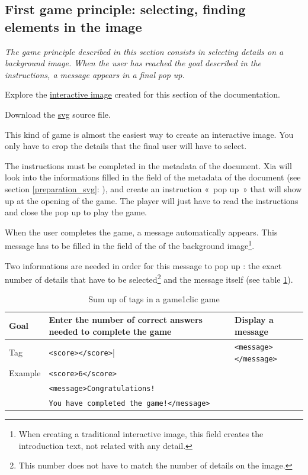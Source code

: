 \subsection{First game principle: selecting, finding elements in the image}\label{game1clicsection}

\textit{The game principle described in this section consists in selecting details 
on a background image. When the user has reached the goal described in the 
instructions, a message appears in a final pop up.}


\begin{links}
Explore the \href{http://xia.dane.ac-versailles.fr/demo/tuto/xia3}{interactive image}
created for this section of the documentation.

Download the \href{http://xia.dane.ac-versailles.fr/demo/tuto/xia3/svg/xia3.svg}{svg} source file.
\end{links}

This kind of game is almost the easiest way to create an interactive image.
You only have to crop the details that the final user will have to select. 

The instructions must be completed in the 
metadata of the document. Xia will look into 
the informations  filled in the  field of the metadata of the document (see section \ref{preparation_svg}: ), and create an instruction «~pop up~» that will show up at the opening of the game. The player will just have to read the instructions and close the pop up to play the game.

When the user completes the game, a message automatically appears.
This message has to be filled in the  field of the  of the 
background image\footnote{When creating a traditional interactive image, 
this field creates the introduction text, not related with any detail.}. 

Two informations are needed in order for this message to pop up :
the exact number of details that have to be selected\footnote{This number does 
not have to match the number of details on the image.}
and the message itself (see table \ref{tag1_sumup}).

\begin{table}
 \begin{tabular}{|l|p{2in}|p{2in}|}
 \hline
  Goal & Enter the number of correct answers needed to complete the game & Display a message\\
  \hline
  Tag & \texttt{<score></score>}| & \texttt{<message></message>}\\
  \hline
  Example & \multicolumn{2}{|l|}{\texttt{<score>6</score>}}\\
   & \multicolumn{2}{|l|}{\texttt{<message>Congratulations!}}\\
    & \multicolumn{2}{|l|}{\texttt{You have completed the game!</message>}}\\
  \hline
 \end{tabular}
\caption{Sum up of tags in a game1clic game}
\label{tag1_sumup}
\end{table}
 
